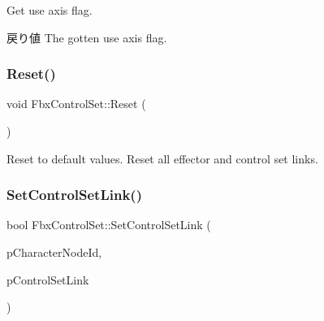 Get use axis flag. \begin{DoxyReturn}{戻り値}
The gotten use axis flag. 
\end{DoxyReturn}
\mbox{\label{class_fbx_control_set_a8e9d668f72300481a7a66bf5e7142200}} 
\subsubsection{\texorpdfstring{Reset()}{Reset()}}
{\footnotesize\ttfamily void Fbx\+Control\+Set\+::\+Reset (\begin{DoxyParamCaption}{ }\end{DoxyParamCaption})}

Reset to default values. Reset all effector and control set links. \mbox{\label{class_fbx_control_set_a448f77a06237db1189da806fb6d841f1}} 
\subsubsection{\texorpdfstring{Set\+Control\+Set\+Link()}{SetControlSetLink()}}
{\footnotesize\ttfamily bool Fbx\+Control\+Set\+::\+Set\+Control\+Set\+Link (\begin{DoxyParamCaption}\item[{\hyperlink{class_fbx_character_ad75bf42026e435ac0ff4d7ece2317be4}{Fbx\+Character\+::\+E\+Node\+Id}}]{p\+Character\+Node\+Id,  }\item[{const \hyperlink{class_fbx_control_set_link}{Fbx\+Control\+Set\+Link} \&}]{p\+Control\+Set\+Link }\end{DoxyParamCaption})}

